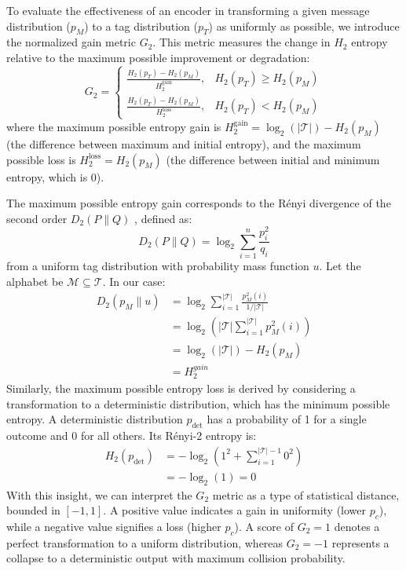 \documentclass[english,BCOR=4mm,cdfont=false]{tudscrreprt} %
\begin{document}
To evaluate the effectiveness of an encoder in transforming a given message distribution ($p_M$) to a tag distribution ($p_T$) as uniformly as possible, we introduce the normalized gain metric $G_2$. This metric measures the change in $H_2$ entropy relative to the maximum possible improvement or degradation:
\begin{equation}
     G_2 = 
    \begin{cases}
        \frac{H_2(p_{T}) - H_2(p_{M})}{H_2^{\text{gain}}}, &  H_2(p_{T}) \ge H_2(p_{M}) \\
        \frac{H_2(p_{T}) - H_2(p_{M})}{H_2^{\text{loss}}}, &  H_2(p_{T}) < H_2(p_{M})
    \end{cases}
\end{equation}
where the maximum possible entropy gain is $H_2^{\text{gain}} = \log_2(|\mathcal{T}|) - H_2(p_M)$ (the difference between maximum and initial entropy), and the maximum possible loss is $H_2^{\text{loss}} = H_2(p_M)$ (the difference between initial and minimum entropy, which is 0).

The maximum possible entropy gain corresponds to the Rényi divergence of the second order $D_2(P\|Q)$ \cite{van_Erven_2014}, defined as: 
\begin{equation}
    D_2(P\|Q) = \log_2 \sum_{i=1}^n \frac{p_i^2}{q_i}
\end{equation}
from a uniform tag distribution with probability mass function $u$. Let the alphabet be $\mathcal{M} \subseteq \mathcal{T}$. In our case:
 \begin{align}
     D_2(p_M\|u) &= \log_2 \sum_{i=1}^{|\mathcal{T}|} \frac{p_M^2(i)}{1/|\mathcal{T}|} \\
     &= \log_2 ( |\mathcal{T}| \sum_{i=1}^{|\mathcal{T}|} p_M^2(i)) \\
     &= \log_2 (|\mathcal{T}|) - H_2(p_M) \\
     &= H_2^{gain}
 \end{align}
Similarly, the maximum possible entropy loss is derived by considering a transformation to a deterministic distribution, which has the minimum possible entropy. A deterministic distribution $p_{\text{det}}$ has a probability of 1 for a single outcome and 0 for all others. Its Rényi-2 entropy is:
 \begin{align}
     H_2(p_{\text{det}}) &= -\log_2 \left( 1^2 + \sum_{i=1}^{|\mathcal{T}|-1} 0^2 \right) \\
        &= -\log_2(1) = 0
 \end{align}
With this insight, we can interpret the $G_2$ metric as a type of statistical distance, bounded in $[-1, 1]$. A positive value indicates a gain in uniformity (lower $p_c$), while a negative value signifies a loss (higher $p_c$). A score of $G_2 = 1$ denotes a perfect transformation to a uniform distribution, whereas $G_2 = -1$ represents a collapse to a deterministic output with maximum collision probability.
\end{document}
